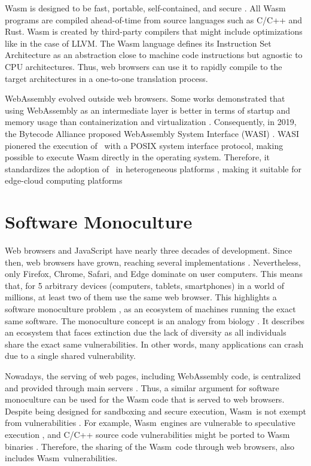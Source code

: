 Wasm is designed to be fast, portable, self-contained, and secure \cite{Haas_2017}.
All Wasm programs are compiled ahead-of-time from source languages such as C/C++ and Rust.
Wasm is created by third-party compilers that might include optimizations like in the case of LLVM.  
The Wasm language defines its Instruction Set Architecture \cite{wasm_spec} as an abstraction close to machine code instructions but agnostic to CPU architectures. Thus,  web browsers can use it to rapidly compile to the target architectures in a one-to-one translation process.

WebAssembly evolved outside web browsers.
Some works demonstrated that using WebAssembly as an intermediate layer is better in terms of startup and memory usage than containerization and virtualization \cite{pMendkiServerless, 1244493Jacobsson}. 
Consequently, in 2019, the Bytecode Alliance \cite{bytecodealliance} proposed WebAssembly System Interface (WASI) \cite{WASI}. 
WASI pionered the execution of \wasm\ with a POSIX system interface protocol, making possible to execute Wasm directly in the operating system. 
Therefore, it standardizes the adoption of \wasm\ in heterogeneous platforms \cite{bryant2020webassembly}, making it suitable for edge-cloud computing platforms \cite{9640153, wen2020wasmachine}

\section{Software Monoculture}
Web browsers and JavaScript have nearly three decades of development.
Since then, web browsers have grown, reaching several implementations \cite{grosskurth2005reference, GARCES2021111004}. 
Nevertheless, only Firefox, Chrome, Safari, and Edge dominate on user computers.
This means that, for 5 arbitrary devices (computers, tablets, smartphones) in a world of millions, at least two of them use the same web browser.
This highlights a software monoculture problem \cite{goth2003addressing}, as an ecosystem of machines running the exact same software. 
The monoculture concept is an analogy from biology \cite{lala2009monoculture}. 
It describes an ecosystem that faces extinction due the lack of diversity as all individuals share the exact same vulnerabilities.
In other words, many applications can crash due to a single shared vulnerability.


\renewcommand{\wasm}{Wasm}

Nowadays, the serving of web pages, including WebAssembly code, is centralized and provided through main servers \cite{STRAC}.
Thus, a similar argument for software monoculture can be used for the Wasm code that is served to web browsers. 
Despite being designed for sandboxing and secure execution, \wasm\ is not exempt from vulnerabilities \cite{WebAssemblySecurity}.
For example, \wasm\ engines are vulnerable to speculative execution \cite{Narayan2021Swivel}, and C/C++ source code vulnerabilities might be ported to Wasm binaries \cite{DeRoover2022}.  
Therefore, the sharing of the \wasm\ code through web browsers, also includes \wasm\ vulnerabilities.


